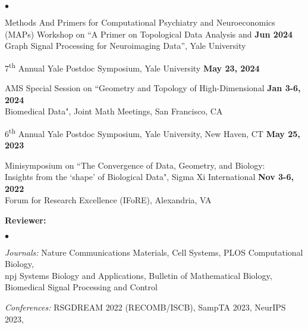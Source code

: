 \documentclass[margin,line]{res}
\newenvironment{list1}{
  \begin{list}{\ding{113}}{
      \setlength{\itemsep}{0in}
      \setlength{\parsep}{0in} \setlength{\parskip}{0in}
      \setlength{\topsep}{0in} \setlength{\partopsep}{0in}
      \setlength{\leftmargin}{0.17in}}}{\end{list}}
\newenvironment{list2}{
  \begin{list}{$\bullet$}{
      \setlength{\itemsep}{0in}
      \setlength{\parsep}{0in} \setlength{\parskip}{0in}
      \setlength{\topsep}{0in} \setlength{\partopsep}{0in}
      \setlength{\leftmargin}{0.2in}}}{\end{list}}
\begin{document}
\begin{resume}
\begin{list1}
  \setlength\itemsep{0.5em}
  \item[]
  \begin{list2}
  \setlength\itemsep{0.75em}      
  \item[] Methods And Primers for Computational Psychiatry and Neuroeconomics \\
          (MAPs) Workshop on ``A Primer on Topological Data Analysis and \hfill {\bf \small Jun 2024}\\
          Graph Signal Processing for Neuroimaging Data'', Yale University
  \item[] 7\textsuperscript{th} Annual Yale Postdoc Symposium, Yale University \hfill {\bf \small May 23, 2024}
  \item[] AMS Special Session on ``Geometry and Topology of High-Dimensional \hfill {\bf \small Jan 3-6, 2024} \\
          Biomedical Data", Joint Math Meetings, San Francisco, CA 
  \item[] 6\textsuperscript{th} Annual Yale Postdoc Symposium, Yale University, New Haven, CT \hfill {\bf \small May 25, 2023}
  \item[] Minisymposium on ``The Convergence of Data, Geometry, and Biology:  \\
          Insights from the `shape' of Biological Data", Sigma Xi International \hfill {\bf \small Nov 3-6, 2022} \\
          Forum for Research Excellence (IFoRE), Alexandria, VA 
  \end{list2}
\vspace*{.2cm}
\item[] {\bf Reviewer:}
\vspace*{.2cm}
  \begin{list2}
  \setlength\itemsep{0.5em}
  \item[] \textit{Journals:} \hspace*{1.42em} Nature Communications Materials, Cell Systems, PLOS Computational Biology, \\ 
  \hspace*{5.9em} npj Systems Biology and Applications, Bulletin of Mathematical Biology,\\
  \hspace*{5.9em} Biomedical Signal Processing and Control
  \item[] \textit{Conferences:} \hspace*{0.1em} RSGDREAM 2022 (RECOMB/ISCB), SampTA 2023, NeurIPS 2023, \\

\end{list2}
\end{list1}
\end{resume}
\end{document}
